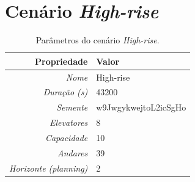 \section{Cenário \textit{High-rise}}

\lipsum[1]

\begin{table}[htb!]
\centering
\caption{Parâmetros do cenário \textit{High-rise}.}
\label{tab:results:highrise:params}
\begin{tabular}{|r|l|}
\hline
\textbf{Propriedade}          & \textbf{Valor}       \\ \hline
\textit{Nome}                 & High-rise            \\ \hline
\textit{Duração (s)}          & 43200                \\ \hline
\textit{Semente}              & w9JwgykwejtoL2icSgHo \\ \hline
\textit{Elevatores}           & 8                    \\ \hline
\textit{Capacidade}           & 10                   \\ \hline
\textit{Andares}              & 39                   \\ \hline
\textit{Horizonte (planning)} & 2                    \\ \hline
\end{tabular}
\end{table}

